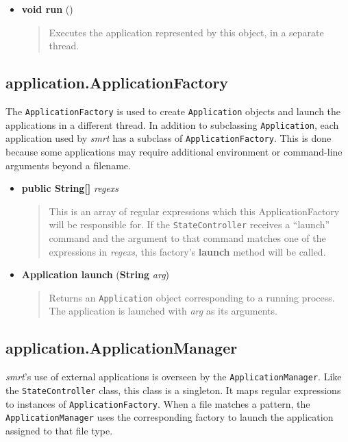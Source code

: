 \documentclass[letterpaper, titlepage, 11pt]{article}
\begin{document}
\begin{itemize}
\item[] \textbf{void run} ()
\begin{quotation}
Executes the application represented by this object, in a separate thread.
\end{quotation}
\end{itemize}

\subsection{application.ApplicationFactory}
The \texttt{ApplicationFactory} is used to create \texttt{Application} objects
and launch the applications in a different thread. In addition to subclassing
\texttt{Application}, each application used by \textit{smrt} has a subclass of
\texttt{ApplicationFactory}.  This is done because some applications may
require additional environment or command-line arguments beyond a filename.

\pagebreak %

\begin{itemize}
\item[] \textbf{public String[]} \textit{regexs}
\begin{quotation}
This is an array of regular expressions which this ApplicationFactory will
be responsible for.  If the \texttt{StateController} receives a ``launch''
command and the argument to that command matches one of the expressions in
\textit{regexs}, this factory's \textbf{launch} method will be called.
\end{quotation}
\item[] \textbf{Application launch} (\textbf{String} \textit{arg})
\begin{quotation}
Returns an \texttt{Application} object corresponding to a running process. The
application is launched with \textit{arg} as its arguments.
\end{quotation}
\end{itemize}

\subsection{application.ApplicationManager}
\textit{smrt}'s use of external applications is overseen by the
\texttt{ApplicationManager}. Like the \texttt{StateController} class, this class
is a singleton. It maps regular expressions to instances of
\texttt{ApplicationFactory}. When a file matches a pattern, the
\texttt{ApplicationManager} uses the corresponding factory to launch the
application assigned to that file type.
\end{document}
